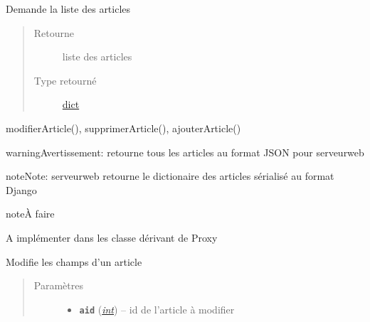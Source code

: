 \documentclass[letterpaper,10pt,french]{sphinxmanual}
\begin{document}
\begin{fulllineitems}
\begin{fulllineitems}
\begin{quote}
\begin{description}
\begin{itemize}
\end{itemize}

\end{description}\end{quote}

\end{fulllineitems}


\begin{fulllineitems}
\label{proxy:proxy.Proxy.listerArticles}
Demande la liste des articles
\begin{quote}\begin{description}
\item[{Retourne}] \leavevmode
liste des articles

\item[{Type retourné}] \leavevmode
\href{https://docs.python.org/library/stdtypes.html\#dict}{dict}

\end{description}\end{quote}




modifierArticle(), supprimerArticle(), ajouterArticle()



\begin{notice}{warning}{Avertissement:}
retourne tous les articles au format JSON pour serveurweb
\end{notice}

\begin{notice}{note}{Note:}
serveurweb retourne le dictionaire des articles sérialisé au format Django
\end{notice}

\begin{notice}{note}{À faire}

A implémenter dans les classe dérivant de Proxy
\end{notice}

\end{fulllineitems}


\begin{fulllineitems}
\label{proxy:proxy.Proxy.modifierArticle}
Modifie les champs d'un article
\begin{quote}\begin{description}
\item[{Paramètres}] \leavevmode\begin{itemize}
\item {} 
\textbf{\texttt{aid}} (\href{https://docs.python.org/library/functions.html\#int}{\emph{int}}) -- id de l'article à modifier


\end{itemize}
\end{description}
\end{quote}
\end{fulllineitems}
\end{fulllineitems}
\end{document}
